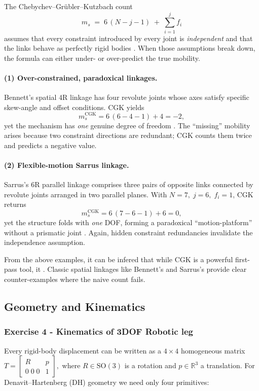 \documentclass[12pt,a4paper]{article}
\begin{document}
The Chebychev–Grübler–Kutzbach count
\[
m_s \;=\; 6\,(N-j-1)\;+\;\sum_{i=1}^{j}f_i
\]
assumes that every constraint introduced by every joint is \emph{independent}
and that the links behave as perfectly rigid bodies
\cite[Ch.~1]{Hunt1978}.  When those assumptions break down, the formula
can either under- or over-predict the true mobility.

\paragraph{(1) Over-constrained, paradoxical linkages.}
Bennett’s spatial 4R linkage has four revolute joints whose axes satisfy
specific skew-angle and offset conditions.
CGK yields
\[
m_s^{\text{CGK}} = 6\,(6-4-1)+4 = -2,
\]
yet the mechanism has \emph{one} genuine degree of freedom
\cite[Sec.~3.3.3]{Tsai1999}.  
The “missing” mobility arises because two constraint directions are
redundant; CGK counts them twice and predicts a negative value.

\paragraph{(2) Flexible-motion Sarrus linkage.}
Sarrus’s 6R parallel linkage comprises three pairs of opposite links
connected by revolute joints arranged in two parallel planes.
With \(N=7,\;j=6,\;f_i=1\), CGK returns
\[
m_s^{\text{CGK}} = 6\,(7-6-1)+6 = 0,
\]
yet the structure folds with \emph{one} DOF, forming a paradoxical
“motion-platform” without a prismatic joint
\cite[p.~148]{McCarthy2000}.  
Again, hidden constraint redundancies invalidate the independence
assumption.

From the above examples, it can be infered that while CGK is a powerful first-pass tool, it .  Classic spatial linkages like Bennett’s and Sarrus’s provide
clear counter-examples where the naive count fails.

\newpage

\subsection{Geometry and Kinematics}
\subsubsection*{Exercise 4 -  Kinematics of 3DOF Robotic leg}


Every rigid-body displacement can be written as a $4\times4$ homogeneous matrix
\(
T =
\begin{bmatrix} R & p \\ 0\;0\;0 & 1 \end{bmatrix},
\)
where $R\in\mathrm{SO}(3)$ is a rotation and $p\in\mathbb R^{3}$ a translation.
For Denavit–Hartenberg (DH) geometry we need only four primitives:
\end{document}
